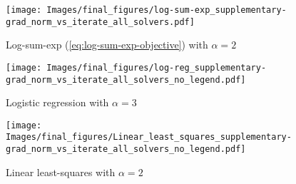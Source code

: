 \begin{figure*}
    \centering
    \begin{subfigure}[t]{0.34\textwidth}
        \centering
        \texttt{[image: Images/final\_figures/log-sum-exp\_supplementary-grad\_norm\_vs\_iterate\_all\_solvers.pdf]}
        \caption{Log-sum-exp (\ref{eq:log-sum-exp-objective}) with $\alpha = 2$}
        \label{fig:log-sum-exp-sup}
    \end{subfigure}
    \begin{subfigure}[t]{0.315\textwidth}
        \centering
        \texttt{[image: Images/final\_figures/log-reg\_supplementary-grad\_norm\_vs\_iterate\_all\_solvers\_no\_legend.pdf]}
        \caption{Logistic regression with $\alpha = 3$}
        \label{fig:log-reg-sup}
    \end{subfigure}
    \begin{subfigure}[t]{0.315\textwidth}
        \centering
        \texttt{[image: Images/final\_figures/Linear\_least\_squares\_supplementary-grad\_norm\_vs\_iterate\_all\_solvers\_no\_legend.pdf]}
        \caption{Linear least-squares with $\alpha = 2$}
        \label{fig:linear-least-squares-sup}
    \end{subfigure}
    \caption{Counterpart to \cref{fig:cvx-objectives}, where learning rates are tuned separately for methods in original coordinates versus under reparameterization. The discrepancy between Adagrad in original coordinates versus under reparameterization is more pronounced in \cref{fig:log-sum-exp-sup} and \cref{fig:linear-least-squares-sup} than in the corresponding plots in \cref{fig:cvx-objectives}, while the qualitative results for logistic regression (\cref{fig:log-reg-sup}) are unchanged.}
    \label{fig:sup-cvx-objectives}
\end{figure*}